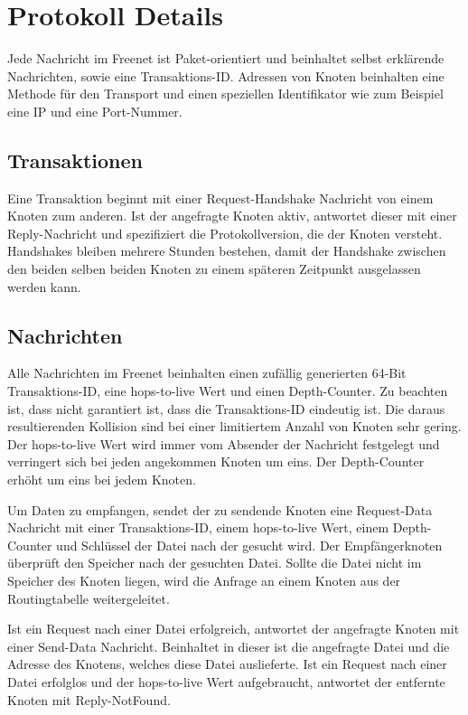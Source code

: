 \section{Protokoll Details}
Jede Nachricht im Freenet ist Paket-orientiert und beinhaltet selbst erklärende
Nachrichten, sowie eine Transaktions-ID.
Adressen von Knoten beinhalten eine Methode für den Transport und einen
speziellen Identifikator wie zum Beispiel eine IP und eine Port-Nummer.

\subsection{Transaktionen}
Eine Transaktion beginnt mit einer Request-Handshake Nachricht von einem Knoten
zum anderen. Ist der angefragte Knoten aktiv, antwortet dieser mit einer
Reply-Nachricht und spezifiziert die Protokollversion, die der Knoten versteht.
Handshakes bleiben mehrere Stunden bestehen, damit der Handshake zwischen den
beiden selben beiden Knoten zu einem späteren Zeitpunkt ausgelassen werden
kann.

\subsection{Nachrichten}
Alle Nachrichten im Freenet beinhalten einen zufällig generierten 64-Bit
Transaktions-ID, eine hops-to-live Wert und einen Depth-Counter.
Zu beachten ist, dass nicht garantiert ist, dass die Transaktions-ID eindeutig
ist. Die daraus resultierenden Kollision sind bei einer limitiertem Anzahl von
Knoten sehr gering. Der hops-to-live Wert wird immer vom Absender der Nachricht
festgelegt und verringert sich bei jeden angekommen Knoten um eins. Der
Depth-Counter erhöht um eins bei jedem Knoten.

Um Daten zu empfangen, sendet der zu sendende Knoten eine Request-Data
Nachricht mit einer Transaktions-ID, einem hops-to-live Wert, einem
Depth-Counter und Schlüssel der Datei nach der gesucht wird.
Der Empfängerknoten überprüft den Speicher nach der gesuchten Datei. Sollte
die Datei nicht im Speicher des Knoten liegen, wird die Anfrage an einem Knoten
aus der Routingtabelle weitergeleitet.

Ist ein Request nach einer Datei erfolgreich, antwortet der angefragte Knoten mit
einer Send-Data Nachricht. Beinhaltet in dieser ist die angefragte Datei und
die Adresse des Knotens, welches diese Datei auslieferte.
Ist ein Request nach einer Datei erfolglos und der hops-to-live Wert
aufgebraucht, antwortet der entfernte Knoten mit Reply-NotFound.

